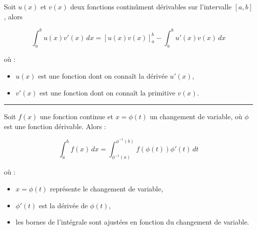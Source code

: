\begin{f}  

Soit \( u(x) \) et \( v(x) \) deux fonctions continûment dérivables sur l'intervalle \([a, b]\), alors

\[
\int_a^b u(x) v'(x) \, dx = \left[ u(x) v(x) \right]_a^b - \int_a^b u'(x) v(x) \, dx
\]

où :
\begin{itemize}
    \item \( u(x) \) est une fonction dont on connaît la dérivée \( u'(x) \),
    \item \( v'(x) \) est une fonction dont on connaît la primitive \( v(x) \).
\end{itemize}

\end{f}
\hrule
\begin{f} 

Soit \( f(x) \) une fonction continue et \( x = \phi(t) \) un changement de variable, où \( \phi \) est une fonction dérivable. Alors :

\[
\int_{a}^{b} f(x) \, dx = \int_{\phi^{-1}(a)}^{\phi^{-1}(b)} f(\phi(t)) \phi'(t) \, dt
\]

où :
\begin{itemize}
    \item \( x = \phi(t) \) représente le changement de variable,
    \item \( \phi'(t) \) est la dérivée de \( \phi(t) \),
    \item les bornes de l'intégrale sont ajustées en fonction du changement de variable.
\end{itemize}
\end{f}

